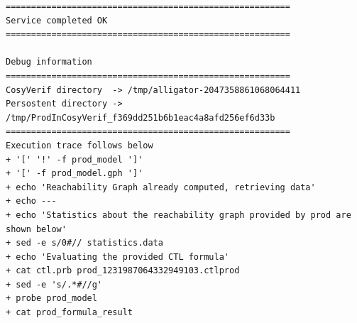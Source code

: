\documentclass[a4paper,11pt]{report}
\begin{document}
\begin{verbatim}
========================================================
Service completed OK
========================================================

Debug information
========================================================
CosyVerif directory  -> /tmp/alligator-2047358861068064411
Persostent directory -> /tmp/ProdInCosyVerif_f369dd251b6b1eac4a8afd256ef6d33b
========================================================
Execution trace follows below
+ '[' '!' -f prod_model ']'
+ '[' -f prod_model.gph ']'
+ echo 'Reachability Graph already computed, retrieving data'
+ echo ---
+ echo 'Statistics about the reachability graph provided by prod are shown below'
+ sed -e s/0#// statistics.data
+ echo 'Evaluating the provided CTL formula'
+ cat ctl.prb prod_1231987064332949103.ctlprod
+ sed -e 's/.*#//g'
+ probe prod_model
+ cat prod_formula_result

\end{verbatim}	
	
\end{document}
